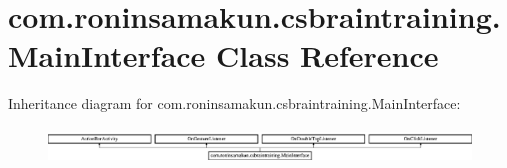 \section{com.\+roninsamakun.\+csbraintraining.\+Main\+Interface Class Reference}
\label{classcom_1_1roninsamakun_1_1csbraintraining_1_1_main_interface}
Inheritance diagram for com.\+roninsamakun.\+csbraintraining.\+Main\+Interface\+:\begin{figure}[H]
\begin{center}
\leavevmode
\includegraphics[height=0.949153cm]{classcom_1_1roninsamakun_1_1csbraintraining_1_1_main_interface}
\end{center}
\end{figure}
